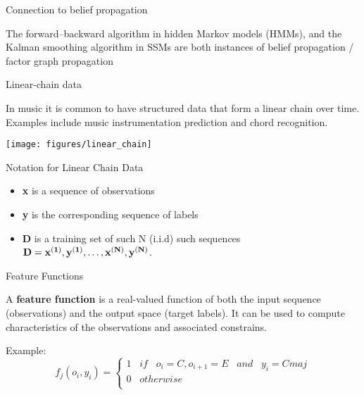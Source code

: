 \documentclass[12pt]{beamer}
\begin{document}
\begin{frame}{Connection to belief propagation} 

  The forward–backward algorithm in hidden Markov models (HMMs), and
  the Kalman smoothing algorithm in SSMs are both instances of belief
  propagation / factor graph propagation
  \end{frame} 


\begin{frame}{Linear-chain data}

  In music it is common to have structured data that form a linear
  chain over time. Examples include music instrumentation prediction
  and chord recognition.

  \texttt{[image: figures/linear\_chain]}  

\end{frame}


\begin{frame}{Notation for Linear Chain Data}
  \begin{itemize}
  \item {\bf x} is a sequence of observations
  \item {\bf y}  is the corresponding sequence of labels
  \item {\bf D} is a training set of such N (i.i.d) such
    sequences $\bf D = {{\bf x^{(1)},y^{(1)}}, \dots, {\bf x^{(N)},y^{(N)}}}$. 
\end{itemize} 
\end{frame}

\begin{frame}{Feature Functions}

  \begin{definition}{}
    A {\bf feature function} is a real-valued function of both the
    input sequence (observations) and the output space (target
    labels). It can be used to compute characteristics of the
    observations and associated constrains.
  \end{definition}

  Example:
  \[
  f_j(o_i, y_i) = \begin{cases}
    1 \;\;\; if \;\;\; o_i = C, o_{i+1} = E \;\;\; and \;\;\; y_i = Cmaj \\ 
    0 \;\;\; otherwise  \\ 
    \end{cases} 
  \]
  
  \end{frame} 
\end{document}
